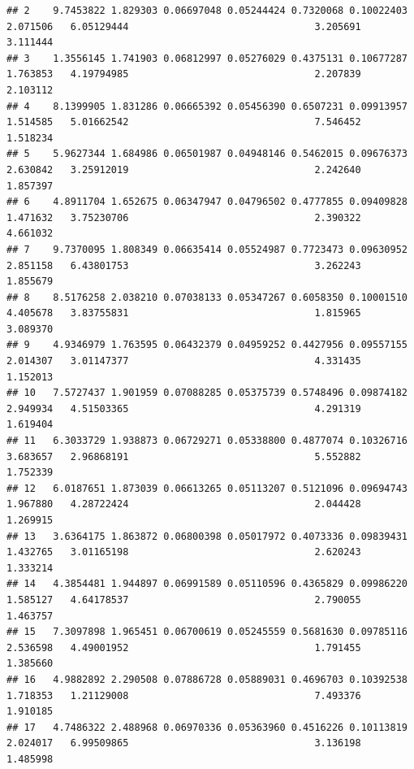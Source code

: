 \documentclass[
]{article}
\begin{document}
\begin{verbatim}
## 2    9.7453822 1.829303 0.06697048 0.05244424 0.7320068 0.10022403                       2.071506   6.05129444                                3.205691       3.111444
## 3    1.3556145 1.741903 0.06812997 0.05276029 0.4375131 0.10677287                       1.763853   4.19794985                                2.207839       2.103112
## 4    8.1399905 1.831286 0.06665392 0.05456390 0.6507231 0.09913957                       1.514585   5.01662542                                7.546452       1.518234
## 5    5.9627344 1.684986 0.06501987 0.04948146 0.5462015 0.09676373                       2.630842   3.25912019                                2.242640       1.857397
## 6    4.8911704 1.652675 0.06347947 0.04796502 0.4777855 0.09409828                       1.471632   3.75230706                                2.390322       4.661032
## 7    9.7370095 1.808349 0.06635414 0.05524987 0.7723473 0.09630952                       2.851158   6.43801753                                3.262243       1.855679
## 8    8.5176258 2.038210 0.07038133 0.05347267 0.6058350 0.10001510                       4.405678   3.83755831                                1.815965       3.089370
## 9    4.9346979 1.763595 0.06432379 0.04959252 0.4427956 0.09557155                       2.014307   3.01147377                                4.331435       1.152013
## 10   7.5727437 1.901959 0.07088285 0.05375739 0.5748496 0.09874182                       2.949934   4.51503365                                4.291319       1.619404
## 11   6.3033729 1.938873 0.06729271 0.05338800 0.4877074 0.10326716                       3.683657   2.96868191                                5.552882       1.752339
## 12   6.0187651 1.873039 0.06613265 0.05113207 0.5121096 0.09694743                       1.967880   4.28722424                                2.044428       1.269915
## 13   3.6364175 1.863872 0.06800398 0.05017972 0.4073336 0.09839431                       1.432765   3.01165198                                2.620243       1.333214
## 14   4.3854481 1.944897 0.06991589 0.05110596 0.4365829 0.09986220                       1.585127   4.64178537                                2.790055       1.463757
## 15   7.3097898 1.965451 0.06700619 0.05245559 0.5681630 0.09785116                       2.536598   4.49001952                                1.791455       1.385660
## 16   4.9882892 2.290508 0.07886728 0.05889031 0.4696703 0.10392538                       1.718353   1.21129008                                7.493376       1.910185
## 17   4.7486322 2.488968 0.06970336 0.05363960 0.4516226 0.10113819                       2.024017   6.99509865                                3.136198       1.485998

\end{verbatim}
\end{document}

